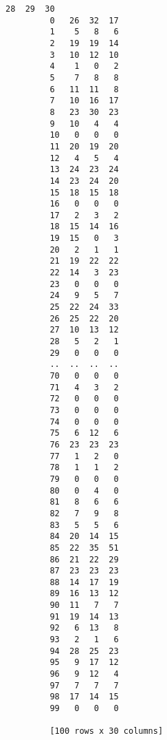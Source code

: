 \documentclass[11pt]{article}
\begin{document}
\begin{Verbatim}[commandchars=\\\{\}]
             28  29  30  
         0   26  32  17  
         1    5   8   6  
         2   19  19  14  
         3   10  12  10  
         4    1   0   2  
         5    7   8   8  
         6   11  11   8  
         7   10  16  17  
         8   23  30  23  
         9   10   4   4  
         10   0   0   0  
         11  20  19  20  
         12   4   5   4  
         13  24  23  24  
         14  23  24  20  
         15  18  15  18  
         16   0   0   0  
         17   2   3   2  
         18  15  14  16  
         19  15   0   3  
         20   2   1   1  
         21  19  22  22  
         22  14   3  23  
         23   0   0   0  
         24   9   5   7  
         25  22  24  33  
         26  25  22  20  
         27  10  13  12  
         28   5   2   1  
         29   0   0   0  
         ..  ..  ..  ..  
         70   0   0   0  
         71   4   3   2  
         72   0   0   0  
         73   0   0   0  
         74   0   0   0  
         75   6  12   6  
         76  23  23  23  
         77   1   2   0  
         78   1   1   2  
         79   0   0   0  
         80   0   4   0  
         81   8   6   6  
         82   7   9   8  
         83   5   5   6  
         84  20  14  15  
         85  22  35  51  
         86  21  22  29  
         87  23  23  23  
         88  14  17  19  
         89  16  13  12  
         90  11   7   7  
         91  19  14  13  
         92   6  13   8  
         93   2   1   6  
         94  28  25  23  
         95   9  17  12  
         96   9  12   4  
         97   7   7   7  
         98  17  14  15  
         99   0   0   0  
         
         [100 rows x 30 columns]
\end{Verbatim}
            
\end{document}
